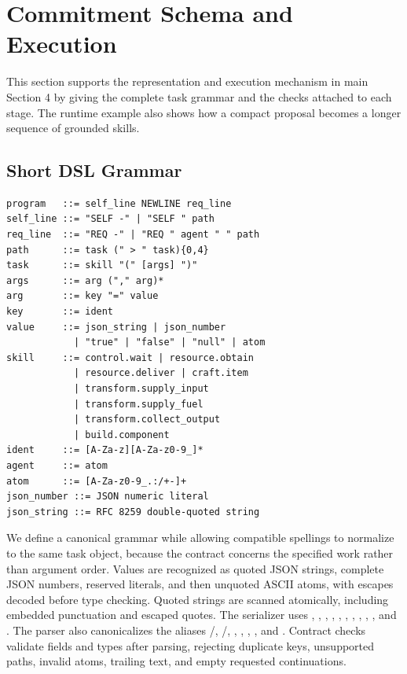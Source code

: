 \documentclass[sigconf,nonacm,balance=false]{aamas}
\begin{document}
\section{Commitment Schema and Execution}
\label{sec:supp-runtime}

This section supports the representation and execution mechanism in main Section 4 by giving the complete task grammar and the checks attached to each stage. The runtime example also shows how a compact proposal becomes a longer sequence of grounded skills.

\subsection{Short DSL Grammar}

\begin{lstlisting}[style=gcpdsl]
program   ::= self_line NEWLINE req_line
self_line ::= "SELF -" | "SELF " path
req_line  ::= "REQ -" | "REQ " agent " " path
path      ::= task (" > " task){0,4}
task      ::= skill "(" [args] ")"
args      ::= arg ("," arg)*
arg       ::= key "=" value
key       ::= ident
value     ::= json_string | json_number
            | "true" | "false" | "null" | atom
skill     ::= control.wait | resource.obtain
            | resource.deliver | craft.item
            | transform.supply_input
            | transform.supply_fuel
            | transform.collect_output
            | build.component
ident     ::= [A-Za-z][A-Za-z0-9_]*
agent     ::= atom
atom      ::= [A-Za-z0-9_.:/+-]+
json_number ::= JSON numeric literal
json_string ::= RFC 8259 double-quoted string
\end{lstlisting}

We define a canonical grammar while allowing compatible spellings to normalize to the same task object, because the contract concerns the specified work rather than argument order. Values are recognized as quoted JSON strings, complete JSON numbers, reserved literals, and then unquoted ASCII atoms, with escapes decoded before type checking. Quoted strings are scanned atomically, including embedded punctuation and escaped quotes. The serializer uses , , , , , , , , , , and . The parser also canonicalizes the aliases /, /, , , , , and . Contract checks validate fields and types after parsing, rejecting duplicate keys, unsupported paths, invalid atoms, trailing text, and empty requested continuations.
\end{document}
